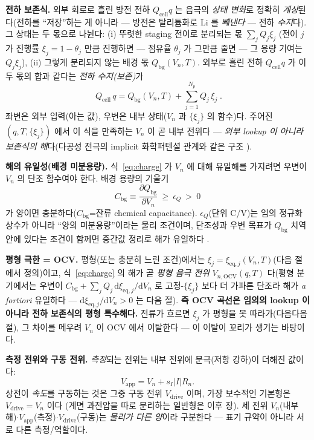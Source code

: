 \documentclass[11pt,a4paper]{article}
\newcommand{\dd}{\mathrm{d}}
\newcommand{\eq}{\mathrm{eq}}
\newcommand{\app}{\mathrm{app}}
\newcommand{\drive}{\mathrm{drive}}
\newcommand{\cell}{\mathrm{cell}}
\newcommand{\bg}{\mathrm{bg}}
\newcommand{\OCV}{\mathrm{OCV}}
\begin{document}
\textbf{전하 보존식.} 외부 회로로 흘린 방전 전하 $Q_\cell q$ 는 음극의 \emph{상태 변화}로 정확히 \emph{계상}된다(전하를 ``저장''하는 게
아니라 — 방전은 탈리튬화로 Li 를 \emph{빼낸다} — 전하 \emph{수지}다). 그 상태는 두 몫으로 나뉜다:
(i) 뚜렷한 staging 전이로 분리되는 몫 $\sum_j Q_j\xi_j$ (전이 $j$ 가 진행률 $\xi_j=1-\theta_j$ 만큼 진행하면 — 점유율
$\theta_j$ 가 그만큼 줄면 — 그 용량 기여는 $Q_j\xi_j$), (ii) 그렇게 분리되지 않는 배경 몫 $Q_\bg(V_n,T)$. 외부로 흘린 전하 $Q_\cell q$ 가 이 두 몫의 합과
같다는 \emph{전하 수지(보존)}가
\begin{equation}
\boxed{\;Q_\cell\,q=Q_\bg(V_n,T)+\sum_{j=1}^{N_p}Q_j\,\xi_j\;.}
\label{eq:charge}
\end{equation}
좌변은 외부 입력(아는 값), 우변은 내부 상태($V_n$ 과 $\{\xi_j\}$ 의 함수)다. 주어진 $(q,T,\{\xi_j\})$ 에서 이
식을 만족하는 $V_n$ 이 곧 내부 전위다 — \emph{외부 lookup 이 아니라 보존식의 해}다(다공성 전극의 implicit
화학퍼텐셜 관계와 같은 구조 \cite{mckinnon1983,newman2004}).

\textbf{해의 유일성(배경 미분용량).} 식~\eqref{eq:charge} 가 $V_n$ 에 대해 유일해를 가지려면 우변이 $V_n$ 의
단조 함수여야 한다. 배경 용량의 기울기
\begin{equation}
C_\bg\equiv\frac{\partial Q_\bg}{\partial V_n}\ \ge\ \epsilon_Q\ >\ 0
\label{eq:cbg}
\end{equation}
가 양이면 충분하다($C_\bg$=잔류 chemical capacitance). $\epsilon_Q$(단위 C/V)는 임의 정규화 상수가 아니라 ``양의
미분용량''이라는 물리 조건이며, 단조성과 우변 목표가 $Q_\bg$ 치역 안에 있다는 조건이 함께면 중간값 정리로 해가
유일하다 \cite{bazant2013}.

\textbf{평형 극한 = OCV.} 평형(또는 충분히 느린 조건)에서는 $\xi_j=\xi_{\eq,j}(V_n,T)$(다음 절에서 정의)이고,
식~\eqref{eq:charge} 의 해가 곧 \emph{평형 음극 전위} $V_{n,\OCV}(q,T)$ 다(평형 분기에서는 우변이 $C_\bg+\sum_j
Q_j\,\dd\xi_{\eq,j}/\dd V_n$ 로 고정-$\{\xi_j\}$ 보다 더 가파른 단조라 해가 \emph{a fortiori} 유일하다 —
$\dd\xi_{\eq,j}/\dd V_n>0$ 는 다음 절). \textbf{즉 OCV 곡선은 임의의
lookup 이 아니라 전하 보존식의 평형 특수해다.} 전류가 흐르면 $\xi_j$ 가 평형을 못 따라가(다음다음 절), 그
차이를 메우려 $V_n$ 이 OCV 에서 이탈한다 — 이 이탈이 꼬리가 생기는 바탕이다.

\textbf{측정 전위와 구동 전위.} \emph{측정}되는 전위는 내부 전위에 분극(저항 강하)이 더해진 값이다:
\begin{equation}
V_\app=V_n+s_I|I|R_n.
\label{eq:vapp}
\end{equation}
상전이 \emph{속도}를 구동하는 것은 그중 구동 전위 $V_\drive$ 이며, 가장 보수적인 기본형은 $V_\drive=V_n$ 이다
(계면 과전압을 따로 분리하는 일반형은 이후 장). 세 전위 $V_n$(내부 해)$\cdot V_\app$(측정)$\cdot V_\drive$(구동)는
\emph{물리가 다른 양}이라 구분한다 — 표기 규약이 아니라 서로 다른 측정/역할이다.
\end{document}
